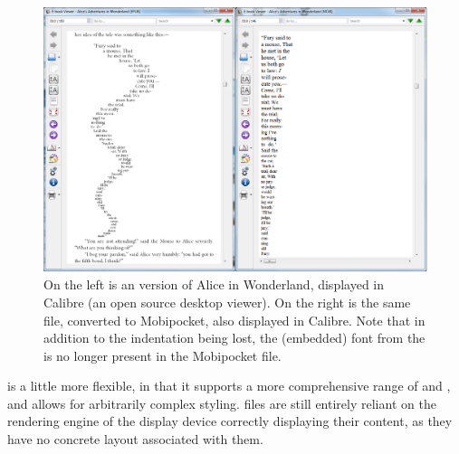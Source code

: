 \begin{figure}[tb]
\includegraphics[width=\textwidth]{gfx/alices1}
\caption[Document displayed in Calibre]{On the left is
an \epub{} version of Alice in Wonderland, displayed in Calibre (an open source desktop \ebook{}
viewer). On the right is the same file, converted to Mobipocket, also displayed in Calibre. Note
that in addition to the indentation being lost, the (embedded) font from the \epub{} is no longer
present in the Mobipocket file.}
\label{alices1}
\end{figure}


\epub{} is a little more flexible, in that it supports a more comprehensive range of \xhtml{} and
\css{}, and allows for arbitrarily complex styling. \epub{} files are still entirely reliant on the
rendering engine of the display device correctly displaying their content, as they have no concrete
layout associated with them.

